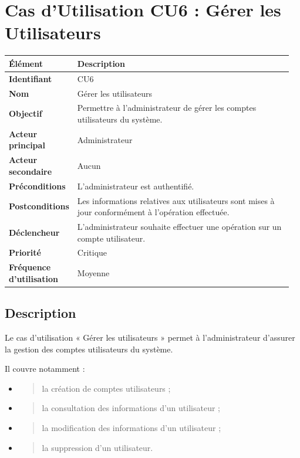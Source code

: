 \hypertarget{cas-dutilisation-cu6-guxe9rer-les-utilisateurs}{%
\section{Cas d'Utilisation CU6 : Gérer les
Utilisateurs}\label{cas-dutilisation-cu6-guxe9rer-les-utilisateurs}}

\begin{longtable}{@{}p{0.18\linewidth}p{0.78\linewidth}@{}}
\toprule
\rowcolors{2}{gray!10}{white}
\textbf{Élément} & \textbf{Description} \\
\midrule
\endhead
\textbf{Identifiant} & CU6 \\
\textbf{Nom} & Gérer les utilisateurs \\
\textbf{Objectif} & Permettre à l'administrateur de gérer les comptes
utilisateurs du système. \\
\textbf{Acteur principal} & Administrateur \\
\textbf{Acteur secondaire} & Aucun \\
\textbf{Préconditions} & L'administrateur est authentifié. \\
\textbf{Postconditions} & Les informations relatives aux utilisateurs
sont mises à jour conformément à l'opération effectuée. \\
\textbf{Déclencheur} & L'administrateur souhaite effectuer une opération
sur un compte utilisateur. \\
\textbf{Priorité} & Critique \\
\textbf{Fréquence d'utilisation} & Moyenne \\
\bottomrule
\end{longtable}

\hypertarget{description-4}{%
\subsection{Description}\label{description-4}}

Le cas d'utilisation « Gérer les utilisateurs » permet à
l'administrateur d'assurer la gestion des comptes utilisateurs du
système.

Il couvre notamment :

\begin{itemize}
\item
  \begin{quote}
  la création de comptes utilisateurs ;
  \end{quote}
\item
  \begin{quote}
  la consultation des informations d'un utilisateur ;
  \end{quote}
\item
  \begin{quote}
  la modification des informations d'un utilisateur ;
  \end{quote}
\item
  \begin{quote}
  la suppression d'un utilisateur.
  \end{quote}
\end{itemize}

